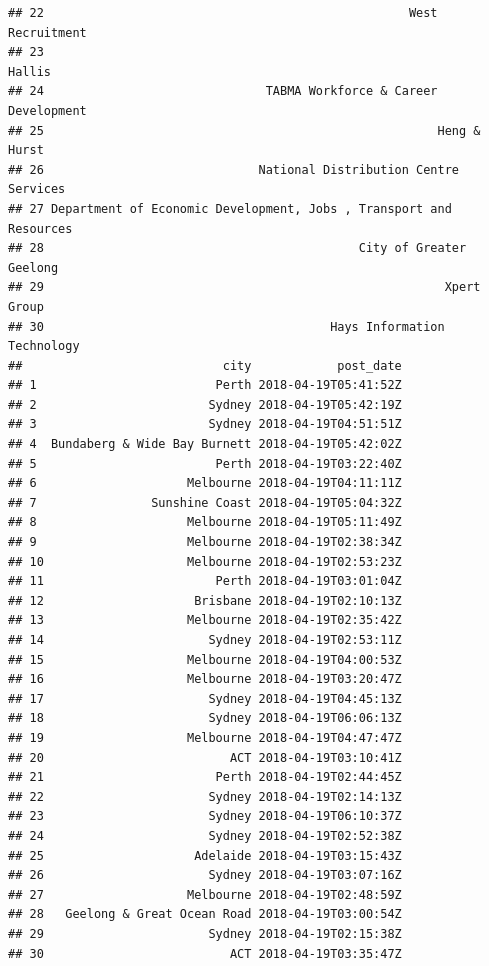 \documentclass[11pt,a4paper,]{article}
\begin{document}
\begin{verbatim}
## 22                                                   West Recruitment
## 23                                                             Hallis
## 24                               TABMA Workforce & Career Development
## 25                                                       Heng & Hurst
## 26                              National Distribution Centre Services
## 27 Department of Economic Development, Jobs , Transport and Resources
## 28                                            City of Greater Geelong
## 29                                                        Xpert Group
## 30                                        Hays Information Technology
##                            city            post_date
## 1                         Perth 2018-04-19T05:41:52Z
## 2                        Sydney 2018-04-19T05:42:19Z
## 3                        Sydney 2018-04-19T04:51:51Z
## 4  Bundaberg & Wide Bay Burnett 2018-04-19T05:42:02Z
## 5                         Perth 2018-04-19T03:22:40Z
## 6                     Melbourne 2018-04-19T04:11:11Z
## 7                Sunshine Coast 2018-04-19T05:04:32Z
## 8                     Melbourne 2018-04-19T05:11:49Z
## 9                     Melbourne 2018-04-19T02:38:34Z
## 10                    Melbourne 2018-04-19T02:53:23Z
## 11                        Perth 2018-04-19T03:01:04Z
## 12                     Brisbane 2018-04-19T02:10:13Z
## 13                    Melbourne 2018-04-19T02:35:42Z
## 14                       Sydney 2018-04-19T02:53:11Z
## 15                    Melbourne 2018-04-19T04:00:53Z
## 16                    Melbourne 2018-04-19T03:20:47Z
## 17                       Sydney 2018-04-19T04:45:13Z
## 18                       Sydney 2018-04-19T06:06:13Z
## 19                    Melbourne 2018-04-19T04:47:47Z
## 20                          ACT 2018-04-19T03:10:41Z
## 21                        Perth 2018-04-19T02:44:45Z
## 22                       Sydney 2018-04-19T02:14:13Z
## 23                       Sydney 2018-04-19T06:10:37Z
## 24                       Sydney 2018-04-19T02:52:38Z
## 25                     Adelaide 2018-04-19T03:15:43Z
## 26                       Sydney 2018-04-19T03:07:16Z
## 27                    Melbourne 2018-04-19T02:48:59Z
## 28   Geelong & Great Ocean Road 2018-04-19T03:00:54Z
## 29                       Sydney 2018-04-19T02:15:38Z
## 30                          ACT 2018-04-19T03:35:47Z

\end{verbatim}
\end{document}
